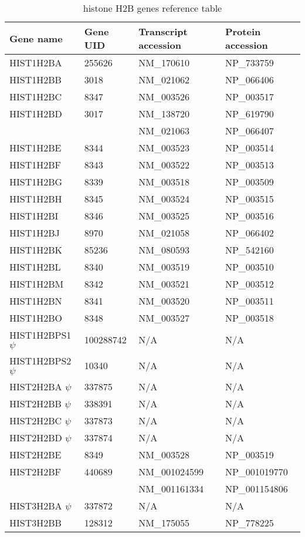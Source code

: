 \documentclass[10pt,a4paper,draft]{article}
\begin{document}
    \begin{table}
      \centering
      \begin{tabular}{l | l | l | l }
        Gene name & Gene UID & Transcript accession & Protein accession \\
        \hline
         HIST1H2BA & 255626 & NM\_170610 & NP\_733759 \\
         HIST1H2BB & 3018 & NM\_021062 & NP\_066406 \\
         HIST1H2BC & 8347 & NM\_003526 & NP\_003517 \\
         HIST1H2BD & 3017 & NM\_138720 & NP\_619790 \\
         \null     & \null & NM\_021063 & NP\_066407 \\
         HIST1H2BE & 8344 & NM\_003523 & NP\_003514 \\
         HIST1H2BF & 8343 & NM\_003522 & NP\_003513 \\
         HIST1H2BG & 8339 & NM\_003518 & NP\_003509 \\
         HIST1H2BH & 8345 & NM\_003524 & NP\_003515 \\
         HIST1H2BI & 8346 & NM\_003525 & NP\_003516 \\
         HIST1H2BJ & 8970 & NM\_021058 & NP\_066402 \\
         HIST1H2BK & 85236 & NM\_080593 & NP\_542160 \\
         HIST1H2BL & 8340 & NM\_003519 & NP\_003510 \\
         HIST1H2BM & 8342 & NM\_003521 & NP\_003512 \\
         HIST1H2BN & 8341 & NM\_003520 & NP\_003511 \\
         HIST1H2BO & 8348 & NM\_003527 & NP\_003518 \\
         HIST1H2BPS1 $\psi$ & 100288742 & N/A & N/A \\
         HIST1H2BPS2 $\psi$ & 10340 & N/A & N/A \\
         HIST2H2BA $\psi$ & 337875 & N/A & N/A \\
         HIST2H2BB $\psi$ & 338391 & N/A & N/A \\
         HIST2H2BC $\psi$ & 337873 & N/A & N/A \\
         HIST2H2BD $\psi$ & 337874 & N/A & N/A \\
         HIST2H2BE & 8349 & NM\_003528 & NP\_003519 \\
         HIST2H2BF & 440689 & NM\_001024599 & NP\_001019770 \\
         \null     & \null  & NM\_001161334 & NP\_001154806 \\
         HIST3H2BA $\psi$ & 337872 & N/A & N/A \\
         HIST3H2BB & 128312 & NM\_175055 & NP\_778225 \\
      \end{tabular}
      \caption{histone H2B genes reference table}
      \label{tab:h2b-ref}
    \end{table}
\end{document}
